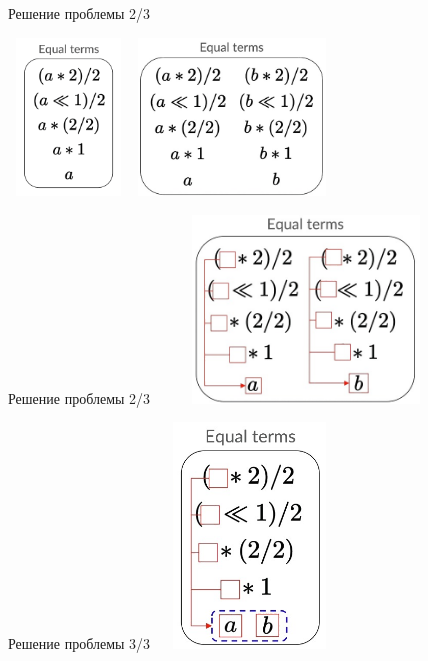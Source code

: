 \documentclass[aspectratio=169
  , xcolor={svgnames}
  , russian  %
  ]{beamer}
\begin{document}
\begin{frame}{Решение проблемы 2/3}
    \begin{center}
            \includegraphics[width=3.2cm, height=4.2cm]{misc/egraphs_images/1_11new.png} 
            \hspace{0.5cm} 
            \hspace{0.5cm}  
            \includegraphics[width=5.2cm, height=4.2cm]{misc/egraphs_images/1_22new.jpg} 
    \end{center}
\end{frame}

\begin{frame}{Решение проблемы 2/3}
    \centering
        \includegraphics[width=8cm, height=5cm]{misc/egraphs_images/shared_im.jpg}
\end{frame}

\begin{frame}{Решение проблемы 3/3}
    \centering
        \includegraphics[width=5cm, height=6cm]{misc/egraphs_images/eclass_new.jpg}
\end{frame}
\end{document}
